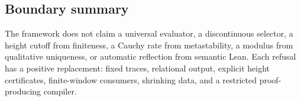 \subsection{Boundary summary}

The framework does not claim a universal evaluator, a discontinuous selector,
a height cutoff from finiteness, a Cauchy rate from metastability, a modulus from
qualitative uniqueness, or automatic reflection from semantic Lean.  Each
refusal has a positive replacement: fixed traces, relational output, explicit
height certificates, finite-window consumers, shrinking data, and a restricted
proof-producing compiler.

